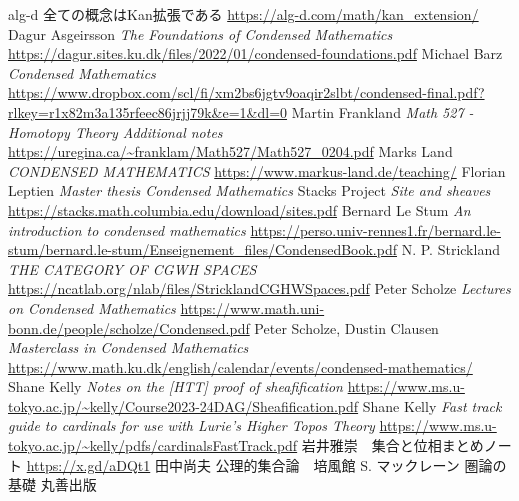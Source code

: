 \documentclass[dvipdfmx,a4paper,11pt]{article}
\theoremstyle{definition}
\begin{document}
\begin{thebibliography}{n}
alg-d 全ての概念はKan拡張である
\url{https://alg-d.com/math/kan_extension/}
Dagur Asgeirsson
\textit{The Foundations of Condensed Mathematics}
\url{https://dagur.sites.ku.dk/files/2022/01/condensed-foundations.pdf}
Michael Barz \textit{Condensed Mathematics}
\url{https://www.dropbox.com/scl/fi/xm2bs6jgtv9oaqir2slbt/condensed-final.pdf?rlkey=r1x82m3a135rfeec86jrjj79k&e=1&dl=0}
Martin Frankland \textit{Math 527 - Homotopy Theory
Additional notes}
\url{https://uregina.ca/~franklam/Math527/Math527_0204.pdf}
Marks Land
\textit{CONDENSED MATHEMATICS}
\url{https://www.markus-land.de/teaching/}
Florian Leptien
\textit{Master thesis Condensed Mathematics}
Stacks Project \textit{Site and sheaves}
\url{https://stacks.math.columbia.edu/download/sites.pdf}
Bernard Le Stum
\textit{An introduction to condensed mathematics}
\url{https://perso.univ-rennes1.fr/bernard.le-stum/bernard.le-stum/Enseignement_files/CondensedBook.pdf}
N. P. Strickland
\textit{THE CATEGORY OF CGWH SPACES}
\url{https://ncatlab.org/nlab/files/StricklandCGHWSpaces.pdf}
Peter Scholze
\textit{Lectures on Condensed Mathematics}
\url{https://www.math.uni-bonn.de/people/scholze/Condensed.pdf}
Peter Scholze, Dustin Clausen
\textit{Masterclass in Condensed Mathematics}
\url{https://www.math.ku.dk/english/calendar/events/condensed-mathematics/}
Shane Kelly \textit{Notes on the [HTT] proof of sheafification}
\url{https://www.ms.u-tokyo.ac.jp/~kelly/Course2023-24DAG/Sheafification.pdf}
Shane Kelly
\textit{Fast track guide to cardinals for use with Lurie’s Higher Topos Theory}
\url{https://www.ms.u-tokyo.ac.jp/~kelly/pdfs/cardinalsFastTrack.pdf}
岩井雅崇　集合と位相まとめノート
\url{https://x.gd/aDQt1}
田中尚夫 公理的集合論　培風館
S. マックレーン 圏論の基礎 丸善出版
\end{thebibliography}
 
\end{document}
